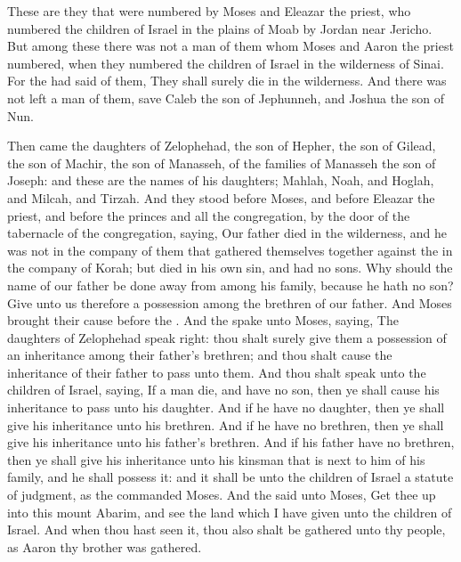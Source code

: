 \begin{biblechapter}
\verse These are they that were numbered by Moses and Eleazar the priest, who numbered the children of Israel in the plains of Moab by Jordan near Jericho.
\verse But among these there was not a man of them whom Moses and Aaron the priest numbered, when they numbered the children of Israel in the wilderness of Sinai.
\verse For the \LORD had said of them, They shall surely die in the wilderness. And there was not left a man of them, save Caleb the son of Jephunneh, and Joshua the son of Nun.
\end{biblechapter}

\begin{biblechapter} %
 Then came the daughters of Zelophehad, the son of Hepher, the son of Gilead, the son of Machir, the son of Manasseh, of the families of Manasseh the son of Joseph: and these are the names of his daughters; Mahlah, Noah, and Hoglah, and Milcah, and Tirzah.
\verse And they stood before Moses, and before Eleazar the priest, and before the princes and all the congregation, by the door of the tabernacle of the congregation, saying,
\verse Our father died in the wilderness, and he was not in the company of them that gathered themselves together against the \LORD in the company of Korah; but died in his own sin, and had no sons.
\verse Why should the name of our father be done away from among his family, because he hath no son? Give unto us therefore a possession among the brethren of our father.
\verse And Moses brought their cause before the \LORD.
\verse And the \LORD spake unto Moses, saying,
\verse The daughters of Zelophehad speak right: thou shalt surely give them a possession of an inheritance among their father's brethren; and thou shalt cause the inheritance of their father to pass unto them.
\verse And thou shalt speak unto the children of Israel, saying, If a man die, and have no son, then ye shall cause his inheritance to pass unto his daughter.
\verse And if he have no daughter, then ye shall give his inheritance unto his brethren.
\verse And if he have no brethren, then ye shall give his inheritance unto his father's brethren.
\verse And if his father have no brethren, then ye shall give his inheritance unto his kinsman that is next to him of his family, and he shall possess it: and it shall be unto the children of Israel a statute of judgment, as the \LORD commanded Moses.
 And the \LORD said unto Moses, Get thee up into this mount Abarim, and see the land which I have given unto the children of Israel.
\verse And when thou hast seen it, thou also shalt be gathered unto thy people, as Aaron thy brother was gathered.

\end{biblechapter}
